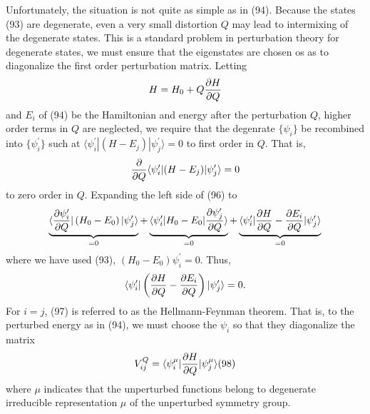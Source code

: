 Unfortunately, the situation is not quite as simple as in (94).  
Because the states (93) are degenerate, even a very small distortion 
$Q$ may lead to intermixing of the degenerate states.  This is a 
standard problem in perturbation theory for degenerate states, we must 
ensure that the eigenstates are chosen os as to diagonalize the first 
order perturbation matrix.  Letting
\begin{equation}
H = H_0 + Q {\partial H \over \partial Q}
\end{equation}
and $E_i$ of (94) be the Hamiltonian and energy after the 
perturbation $Q$, higher order terms in $Q$ are neglected, we require 
that the degenrate $\{ \psi_i\}$ be recombined into $\{ 
\psi_i^{\prime}\}$ such at $\langle \psi_i^{\prime} | ( H-E_j)| 
\psi_j^{\prime} \rangle = 0$ to first order in $Q$.  That is,
\begin{equation}
{\partial \over \partial Q} \langle \psi_i^{\prime} | ( H - E_j)| 
\psi_j^{\prime} \rangle = 0
\label{chap16-eqno96}
\end{equation}
to zero order in $Q$.  Expanding the left side of (96) to
\begin{equation}
\underbrace{\langle {\partial \psi_i^{\prime} \over \partial Q} | 
\left( H_0 - E_0 \right) | \psi_j^{\prime} \rangle}_{=0} + 
\underbrace{ \langle \psi_i^{\prime} | H_0 - E_0 | {\partial 
\psi_j^{\prime} \over \partial Q} \rangle}_{=0} + \underbrace{\langle 
\psi_i^{\prime} | {\partial H \over \partial Q} - {\partial E_i 
\over \partial Q}| \psi_j^{\prime} \rangle}_{=0}
\end{equation}
where we have used (93), $(H_0 - E_0) \psi_i^{\prime} = 0$.  Thus,
\begin{equation}
\langle \psi_i^{\prime} | \left({\partial H \over \partial Q} - 
{\partial E_i \over \partial Q} \right) | \psi_j^{\prime} \rangle = 
0.
\label{chap16-eqno97}
\end{equation}
For $i = j$, (97) is referred to as the Hellmann-Feynman theorem.  
That is, to the perturbed energy as in (94), we must choose the 
$\psi_i$ so that they diagonalize the matrix
\begin{equation}
V^Q_{ij} = \langle \psi_i^{\mu} | {\partial H \over \partial Q} | 
\psi_j^{\mu} \rangle (98)
\end{equation}
where $\mu$ indicates that the unperturbed functions belong to 
degenerate irreducible representation $\mu$ of the unperturbed 
symmetry group.


